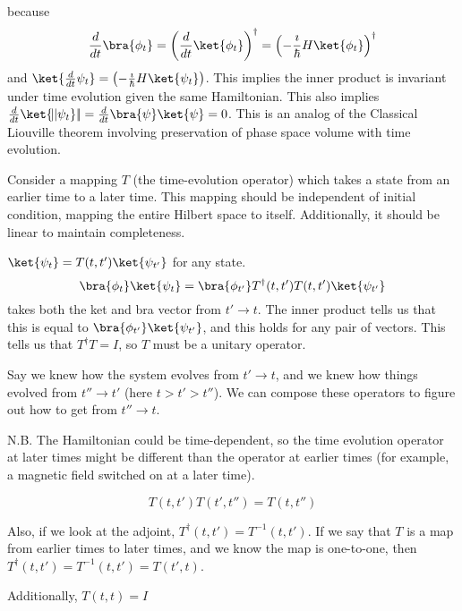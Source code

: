 \documentclass[a4paper,twoside,master.tex]{subfiles}
\begin{document}
because
\begin{equation}
\frac{d}{dt}\bra{\phi_t} = \left(\frac{d}{dt}\ket{\phi_t}\right)^\dagger = \left(-\frac{\imath}{\hbar}H\ket{\phi_t}\right)^\dagger
\end{equation}
and
$\ket{\frac{d}{dt}\psi_t} = \left(-\frac{\imath}{\hbar}H\ket{\psi_t}\right)$.
This implies the inner product is invariant under time evolution given
the same Hamiltonian. This also implies
$\frac{d}{dt}\ket{\!||\psi_t}|\!| = \frac{d}{dt}\bra{\psi}\ket{\psi} = 0$.
This is an analog of the Classical Liouville theorem involving
preservation of phase space volume with time evolution.

Consider a mapping $T$ (the time-evolution operator) which takes a
state from an earlier time to a later time. This mapping should be
independent of initial condition, mapping the entire Hilbert space to
itself. Additionally, it should be linear to maintain completeness.

$\ket{\psi_t} = T(t,t')\ket{\psi_{t'}}$ for any state.
\begin{equation}
    \bra{\phi_t}\ket{\psi_t} = \bra{\phi_{t'}}T^\dagger(t,t')T(t,t')\ket{\psi_{t'}}
\end{equation}
takes both the ket and bra vector from $t'\to t$. The inner product
tells us that this is equal to $\bra{\phi_{t'}}\ket{\psi_{t'}}$,
and this holds for any pair of vectors. This tells us that
$T^\dagger T = I$, so $T$ must be a unitary operator.

Say we knew how the system evolves from $t'\to t$, and we knew how
things evolved from $t''\to t'$ (here $t>t'>t''$). We can compose
these operators to figure out how to get from $t''\to t$.

\begin{note}{N.B.}
The Hamiltonian could be time-dependent, so the time evolution
operator at later times might be different than the operator at earlier
times (for example, a magnetic field switched on at a later time).
\end{note}

\begin{equation}
T(t,t')T(t',t'') = T(t,t'')
\end{equation}

Also, if we look at the adjoint, $T^\dagger(t,t') = T^{-1}(t,t')$. If
we say that $T$ is a map from earlier times to later times, and we
know the map is one-to-one, then
$T^\dagger(t,t') = T^{-1}(t,t') = T(t',t)$.

Additionally, $T(t,t)=I$
\end{document}
